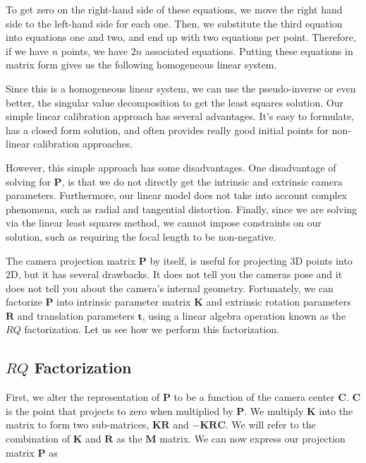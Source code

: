 To get zero on the right-hand side of these equations, we move the right hand side to the left-hand side for each one. Then, we substitute
the third equation into equations one and two, and end up with
two equations per point. Therefore, if we have $n$ points, we have $2n$ associated equations. 
Putting these equations in matrix form gives us the following homogeneous
linear system. 

Since this is a homogeneous linear system, we can use the pseudo-inverse
or even better, the singular value decomposition to get the least
squares solution. Our simple linear
calibration approach has several advantages. It's easy to formulate, has a closed form solution, and often provides
really good initial points for non-linear calibration approaches. 

However, this simple approach has some disadvantages. One disadvantage
of solving for $\mathbf{P}$, is that we do not directly get the intrinsic and extrinsic
camera parameters. Furthermore, our linear model does not take into account
complex phenomena, such as radial and
tangential distortion. Finally, since we are solving via the linear least
squares method, we cannot impose constraints on our solution, such as requiring the focal
length to be non-negative. 

The camera projection matrix $\mathbf{P}$ by itself, is useful for projecting
3D points into 2D, but it has several drawbacks. It does not tell you
the cameras pose and it does not tell you about
the camera's internal geometry. Fortunately, we can
factorize $\mathbf{P}$ into intrinsic parameter matrix $\mathbf{K}$ 
and extrinsic rotation parameters $\mathbf{R}$ and translation parameters $\mathbf{t}$, 
using a linear algebra operation known as the $RQ$ factorization. Let us see how we perform
this factorization. 

\subsection{$RQ$ Factorization}
\label{rq_factorization}

First, we alter the representation of $\mathbf{P}$ to be a function of
the camera center $\mathbf{C}$. $\mathbf{C}$ is the point that projects to
zero when multiplied by $\mathbf{P}$. We multiply $\mathbf{K}$ into the matrix
to form two sub-matrices, $\mathbf{KR}$ and $-\mathbf{KRC}$. 
We will refer to the combination of $\mathbf{K}$ and $\mathbf{R}$ as the $\mathbf{M}$ matrix. 
We can now express our projection matrix $\mathbf{P}$ as 

